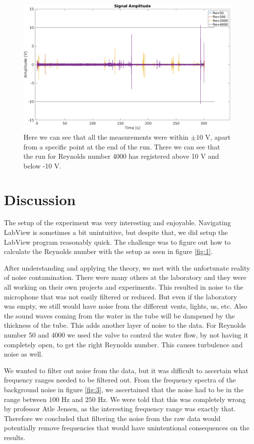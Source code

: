 \documentclass[english,a4paper,12pt]{article}
\begin{document}
\begin{figure}[H]
    \centering
    \includegraphics[width=170mm]{SignalAmplitude.png}
    \caption{Here we can see that all the measurements were within $\pm 10$ V, apart from a specific point at the end of the run. There we can see that the run for Reynolds number 4000 has registered above 10 V and below -10 V.}
    \label{fig:6}
\end{figure}

\section*{Discussion}
The setup of the experiment was very interesting and enjoyable. Navigating LabView is sometimes a bit unintuitive, but despite that, we did setup the LabView program reasonably quick. The challenge was to figure out how to calculate the Reynolds number with the setup as seen in figure \ref{fig:1}. \bigskip

After understanding and applying the theory, we met with the unfortunate reality of noise contamination. There were many others at the laboratory and they were all working on their own projects and experiments. This resulted in noise to the microphone that was not easily filtered or reduced. But even if the laboratory was empty, we still would have noise from the different vents, lights, us, etc. Also the sound waves coming from the water in the tube will be dampened by the thickness of the tube. This adds another layer of noise to the data. For Reynolds number 50 and 4000 we used the valve to control the water flow, by not having it completely open, to get the right Reynolds number. This causes turbulence and noise as well. \bigskip

We wanted to filter out noise from the data, but it was difficult to ascertain what frequency ranges needed to be filtered out. From the frequency spectra of the background noise in figure \ref{fig:3}, we ascertained that the noise had to be in the range between $100$ Hz and $250$ Hz. We were told that this was completely wrong by professor Atle Jensen, as the interesting frequency range was exactly that. Therefore we concluded that filtering the noise from the raw data would potentially remove frequencies that would have unintentional consequences on the results. \bigskip
\end{document}
